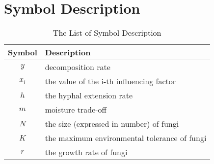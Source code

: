 \pagestyle{fancy}
\newpage
\section{Symbol Description}
\renewcommand\arraystretch{1.2}
\begin{center}
    \begin{longtable}{|c|l|}
    \caption{The List of Symbol Description}\\ \hline
    Symbol & Description \\ \hline

    $y$  & decomposition rate \\ \hline

    $x_{i}$ & the value of the i-th influencing factor \\ \hline

    $h$ & the hyphal extension rate \\ \hline

    $m$ & moisture trade-off \\ \hline

    $N$ & the size (expressed in number) of fungi \\ \hline

    $K$ & the maximum environmental tolerance of fungi \\ \hline

    $r$ & the growth rate of fungi \\ \hline

    \end{longtable}

    \end{center}